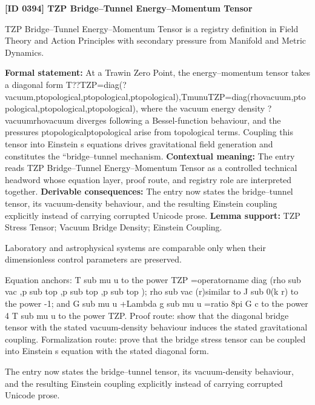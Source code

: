 \clearpage
\noindent\textbf{[ID 0394] TZP Bridge--Tunnel Energy--Momentum Tensor}\par
\vspace{0.35em}
\begingroup\small
{}
TZP Bridge--Tunnel Energy--Momentum Tensor is a registry definition in Field Theory and Action Principles with secondary pressure from Manifold and Metric Dynamics.

\begingroup\footnotesize\setlength{\emergencystretch}{3em}\sloppy
\textbf{Formal statement:} At a Trawin Zero Point, the energy--momentum tensor takes a diagonal form T??TZP=diag(?vacuum,ptopological,ptopological,ptopological),TmunuTZP=diag(rhovacuum,ptopological,ptopological,ptopological), where the vacuum energy density ?vacuumrhovacuum diverges following a Bessel-function behaviour, and the pressures ptopologicalptopological arise from topological terms. Coupling this tensor into Einstein s equations drives gravitational field generation and constitutes the ``bridge--tunnel mechanism. \textbf{Contextual meaning:} The entry reads TZP Bridge--Tunnel Energy--Momentum Tensor as a controlled technical headword whose equation layer, proof route, and registry role are interpreted together. \textbf{Derivable consequences:} The entry now states the bridge--tunnel tensor, its vacuum-density behaviour, and the resulting Einstein coupling explicitly instead of carrying corrupted Unicode prose. \textbf{Lemma support:} TZP Stress Tensor; Vacuum Bridge Density; Einstein Coupling.\par
\endgroup

Laboratory and astrophysical systems are comparable only when their dimensionless control parameters are preserved.

Equation anchors: T sub mu u to the power TZP =operatorname diag (rho sub vac ,p sub top ,p sub top ,p sub top ); rho sub vac (r)similar to J sub 0(k r) to the power -1; and G sub mu u +Lambda g sub mu u =ratio 8pi G c to the power 4 T sub mu u to the power TZP. Proof route: show that the diagonal bridge tensor with the stated vacuum-density behaviour induces the stated gravitational coupling. Formalization route: prove that the bridge stress tensor can be coupled into Einstein s equation with the stated diagonal form.

The entry now states the bridge--tunnel tensor, its vacuum-density behaviour, and the resulting Einstein coupling explicitly instead of carrying corrupted Unicode prose.
\endgroup

